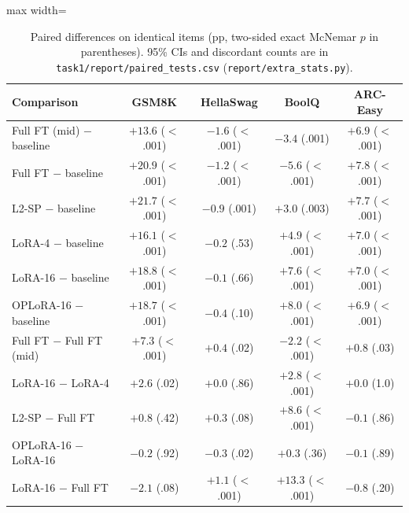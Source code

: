\documentclass{article}
\begin{document}
\begin{table}[h]\centering\small\setlength{\tabcolsep}{5pt}
\begin{adjustbox}{max width=\linewidth}\begin{tabular}{lcccc}\toprule
Comparison & GSM8K & HellaSwag & BoolQ & ARC-Easy \\\midrule
Full FT (mid) $-$ baseline & $+13.6$ ($<$.001) & $-1.6$ ($<$.001) & $-3.4$ (.001) & $+6.9$ ($<$.001) \\
Full FT $-$ baseline       & $+20.9$ ($<$.001) & $-1.2$ ($<$.001) & $-5.6$ ($<$.001) & $+7.8$ ($<$.001) \\
L2-SP $-$ baseline         & $+21.7$ ($<$.001) & $-0.9$ (.001) & $+3.0$ (.003) & $+7.7$ ($<$.001) \\
LoRA-4 $-$ baseline        & $+16.1$ ($<$.001) & $-0.2$ (.53) & $+4.9$ ($<$.001) & $+7.0$ ($<$.001) \\
LoRA-16 $-$ baseline       & $+18.8$ ($<$.001) & $-0.1$ (.66) & $+7.6$ ($<$.001) & $+7.0$ ($<$.001) \\
OPLoRA-16 $-$ baseline     & $+18.7$ ($<$.001) & $-0.4$ (.10) & $+8.0$ ($<$.001) & $+6.9$ ($<$.001) \\\midrule
Full FT $-$ Full FT (mid)  & $+7.3$ ($<$.001) & $+0.4$ (.02) & $-2.2$ ($<$.001) & $+0.8$ (.03) \\
LoRA-16 $-$ LoRA-4         & $+2.6$ (.02) & $+0.0$ (.86) & $+2.8$ ($<$.001) & $+0.0$ (1.0) \\
L2-SP $-$ Full FT          & $+0.8$ (.42) & $+0.3$ (.08) & $+8.6$ ($<$.001) & $-0.1$ (.86) \\
OPLoRA-16 $-$ LoRA-16      & $-0.2$ (.92) & $-0.3$ (.02) & $+0.3$ (.36) & $-0.1$ (.89) \\
LoRA-16 $-$ Full FT        & $-2.1$ (.08) & $+1.1$ ($<$.001) & $+13.3$ ($<$.001) & $-0.8$ (.20) \\\bottomrule
\end{tabular}\end{adjustbox}
\caption{Paired differences on identical items (pp, two-sided exact McNemar $p$ in parentheses). 95\% CIs and discordant counts are in \texttt{task1/report/paired\_tests.csv} (\texttt{report/extra\_stats.py}).}\label{tab:paired}
\end{table}
\end{document}
